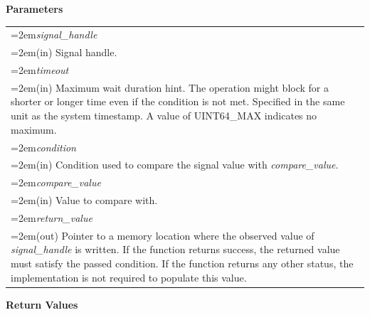 \documentclass[final]{book}
\newcommand{\hsaarg}[1]{\textit{#1}}
\begin{document}
\noindent\textbf{Parameters}\\[-6mm]
\noindent\begin{longtable}{@{}>{\hangindent=2em}p{\textwidth}}
\hsaarg{signal_\-handle}\\\hspace{2em}(in) Signal handle.\\[2mm]
\hsaarg{timeout}\\\hspace{2em}(in) Maximum wait duration hint. The operation might block for a shorter or longer time even if the condition is not met. Specified in the same unit as the system timestamp. A value of UINT64_\-MAX indicates no maximum.\\[2mm]
\hsaarg{condition}\\\hspace{2em}(in) Condition used to compare the signal value with \textit{compare_\-value}.\\[2mm]
\hsaarg{compare_\-value}\\\hspace{2em}(in) Value to compare with.\\[2mm]
\hsaarg{return_\-value}\\\hspace{2em}(out) Pointer to a memory location where the observed value of \textit{signal_\-handle} is written. If the function returns success, the returned value must satisfy the passed condition. If the function returns any other status, the implementation is not required to populate this value.
\end{longtable}
\vspace{-5mm}\noindent\textbf{Return Values}\\[-6mm]
\end{document}
